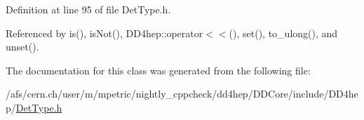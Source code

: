 Definition at line 95 of file DetType.h.

Referenced by is(), isNot(), DD4hep::operator$<$$<$(), set(), to\_\-ulong(), and unset().

The documentation for this class was generated from the following file:\begin{DoxyCompactItemize}
\item 
/afs/cern.ch/user/m/mpetric/nightly\_\-cppcheck/dd4hep/DDCore/include/DD4hep/\hyperlink{_det_type_8h}{DetType.h}\end{DoxyCompactItemize}
